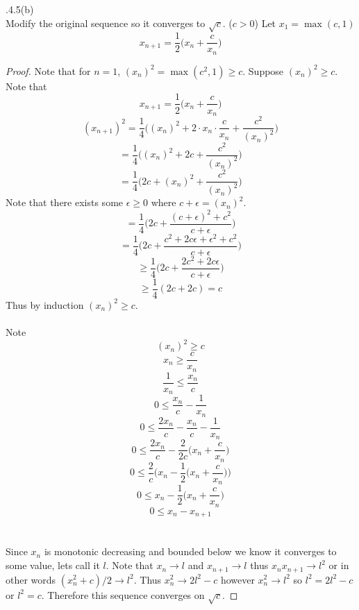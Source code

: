 \documentclass[12pt]{article}
\makeatletter
\theoremstyle{homework}
\newenvironment{exercise}[1]
{\def\@currentlabel{#1}\exercisecore}
{\endexercisecore}
\makeatother
\begin{document}
\begin{exercise}

2.4.5(b)\\
Modify the original sequence so it converges to $\sqrt{c}$. ($c>0$)
\end{exercise}
Let $x_1=\max(c,1)$ 
$$ x_{n+1} =\frac{1}{2} \biggr(x_n+\frac{c}{x_n}\biggr)$$
\begin{proof}
Note that for $n=1$, $(x_n)^2=\max(c^2,1)\geq c$.  Suppose $(x_n)^2\geq c$.  Note that
$$ x_{n+1} =\frac{1}{2} \biggr(x_n+\frac{c}{x_n}\biggr)$$
$$ (x_{n+1})^2 =\frac{1}{4} \biggr((x_n)^2+2\cdot x_n\cdot \frac{c}{x_n}+\frac{c^2}{(x_n)^2}\biggr)$$
$$= \frac{1}{4} \biggr((x_n)^2+2c+\frac{c^2}{(x_n)^2}\biggr)$$
$$= \frac{1}{4} \biggr(2c+(x_n)^2+\frac{c^2}{(x_n)^2}\biggr)$$
Note that there exists some $\epsilon\geq 0$ where $c+\epsilon=(x_n)^2$.
$$= \frac{1}{4} \biggr(2c+\frac{(c+\epsilon)^2+c^2}{c+\epsilon}\biggr)$$
$$= \frac{1}{4} \biggr(2c+\frac{c^2+2c\epsilon+\epsilon^2+c^2}{c+\epsilon}\biggr)$$
$$\geq \frac{1}{4} \biggr(2c+\frac{2c^2+2c\epsilon}{c+\epsilon}\biggr)$$
$$\geq \frac{1}{4} (2c+2c)=c$$
Thus by induction $(x_n)^2\geq c$.\\\\
Note 
$$(x_{n})^2\geq c$$
$$x_{n}\geq \frac{c}{x_{n}}$$
$$\frac{1}{x_{n}}\leq \frac{x_{n}}{c}$$
$$0\leq \frac{x_{n}}{c}-\frac{1}{x_{n}}$$
$$0\leq \frac{2x_{n}}{c}-\frac{x_{n}}{c}-\frac{1}{x_{n}}$$
$$0\leq \frac{2x_{n}}{c}-\frac{2}{2c}\biggr(x_{n}+\frac{c}{x_{n}}\biggr)$$
$$0\leq \frac{2}{c}\biggr(x_{n}-\frac{1}{2}\biggr(x_{n}+\frac{c}{x_{n}}\biggr)\biggr)$$
$$0\leq x_{n}-\frac{1}{2}\biggr(x_{n}+\frac{c}{x_{n}}\biggr)$$
$$0\leq x_{n}-x_{n+1}$$\\\\
Since $x_n$ is monotonic decreasing and bounded below we know it converges to some value, lets call it $l$.  Note that $x_n\rightarrow l$ and $x_{n+1}\rightarrow l$ thus $x_nx_{n+1}\rightarrow l^2$ or in other words $(x_n^2+c)/2\rightarrow l^2$.  Thus $x_n^2\rightarrow 2l^2-c$ however $x_n^2\rightarrow l^2$ so $l^2=2l^2-c$ or $l^2=c$.  Therefore this sequence converges on $\sqrt{c}$.
\end{proof}
\end{document}
